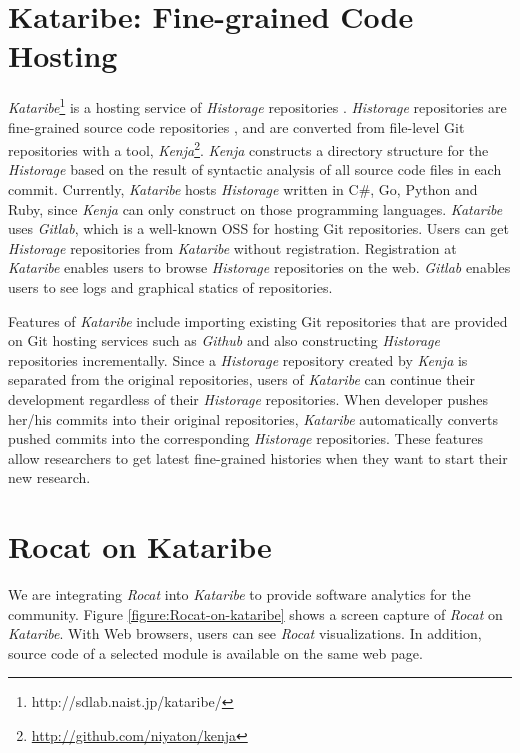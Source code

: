 \documentclass[conference]{IEEEtran}
\newcommand{\figref}[1]{Figure \ref{#1}}
\begin{document}
\section{Kataribe: Fine-grained Code Hosting}
\textit{Kataribe}\footnote{http://sdlab.naist.jp/kataribe/} is a hosting service of \textit{Historage} repositories \cite{Fujiwara:2014:KHS:2597073.2597125}.
\textit{Historage} repositories are fine-grained source code repositories \cite{Hata:2011:HFV:2024445.2024463}, and are converted from file-level Git repositories with a tool, \textit{Kenja}\footnote{\url{http://github.com/niyaton/kenja}}.
\textit{Kenja} constructs a directory structure for the \textit{Historage} based on the result of syntactic analysis of all source code files in each commit.
Currently, \textit{Kataribe} hosts \textit{Historage} written in C\#, Go, Python and Ruby, since \textit{Kenja} can only construct on those programming languages.
\textit{Kataribe} uses \textit{Gitlab}, which is a well-known OSS for hosting Git repositories.
Users can get \textit{Historage} repositories from \textit{Kataribe} without registration.
Registration at \textit{Kataribe} enables users to browse \textit{Historage} repositories on the web.
\textit{Gitlab} enables users to see logs and graphical statics of repositories.

Features of \textit{Kataribe} include importing existing Git repositories that are provided on Git hosting services such as \textit{Github} and also constructing \textit{Historage} repositories incrementally.
Since a \textit{Historage} repository created by \textit{Kenja} is separated from the original repositories, users of \textit{Kataribe} can continue their development regardless of their \textit{Historage} repositories.
When developer pushes her/his commits into their original repositories, \textit{Kataribe} automatically converts pushed commits into the corresponding \textit{Historage} repositories.
These features allow researchers to get latest fine-grained histories when they want to start their new research.

\section{Rocat on Kataribe}
We are integrating \textit{Rocat} into \textit{Kataribe} to provide software analytics for the community.
\figref{figure:Rocat-on-kataribe} shows a screen capture of \textit{Rocat} on \textit{Kataribe}.
With Web browsers, users can see \textit{Rocat} visualizations. In addition, source code of a selected module is available on the same web page.
\end{document}
